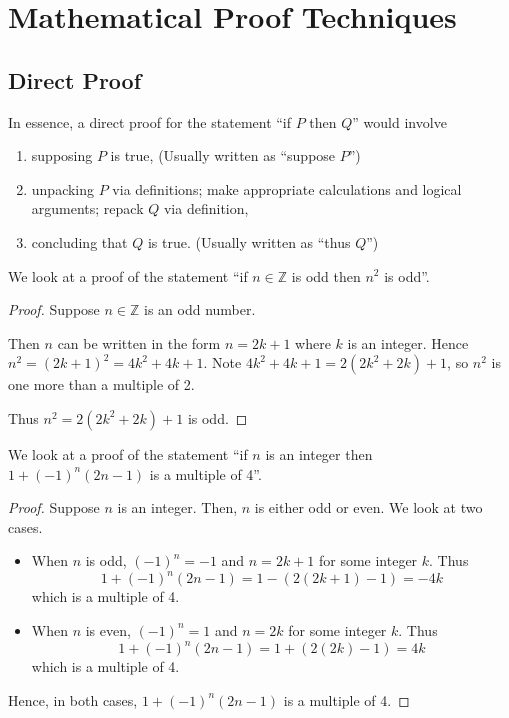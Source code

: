 \newpage

\section{Mathematical Proof Techniques}
\subsection{Direct Proof}
In essence, a direct proof for the statement ``if $P$ then $Q$'' would involve
\begin{enumerate}
    \item supposing $P$ is true, (Usually written as ``suppose $P$'')
    \item unpacking $P$ via definitions; make appropriate calculations and logical arguments; repack $Q$ via definition,
    \item concluding that $Q$ is true. (Usually written as ``thus $Q$'')
\end{enumerate}
\begin{example}
    We look at a proof of the statement ``if $n \in \mathbb{Z}$ is odd then $n^2$ is odd''.
    \begin{proof}
        Suppose $n\in\mathbb{Z}$ is an odd number.
        
        Then $n$ can be written in the form $n = 2k + 1$ where $k$ is an integer. Hence $n^2 = (2k+1)^2 = 4k^2 + 4k + 1$. Note $4k^2 + 4k + 1 = 2(2k^2 + 2k) + 1$, so $n^2$ is one more than a multiple of 2.
        
        Thus $n^2 = 2(2k^2 + 2k) + 1$ is odd.
    \end{proof}
\end{example}

\begin{example}
    We look at a proof of the statement ``if $n$ is an integer then $1 + (-1)^n(2n-1)$ is a multiple of 4''.
    \begin{proof}
        Suppose $n$ is an integer. Then, $n$ is either odd or even. We look at two cases.
        \begin{itemize}
            \item When $n$ is odd, $(-1)^n = -1$ and $n = 2k+1$ for some integer $k$. Thus
            \[
                1 + (-1)^n(2n-1) = 1 - (2(2k+1)-1) = -4k
            \]
            which is a multiple of 4.
            \item When $n$ is even, $(-1)^n = 1$ and $n = 2k$ for some integer $k$. Thus
            \[
                1 + (-1)^n(2n-1) = 1 + (2(2k)-1) = 4k
            \]
            which is a multiple of 4.
        \end{itemize}
        Hence, in both cases, $1 + (-1)^n(2n-1)$ is a multiple of 4.
    \end{proof}
\end{example}

